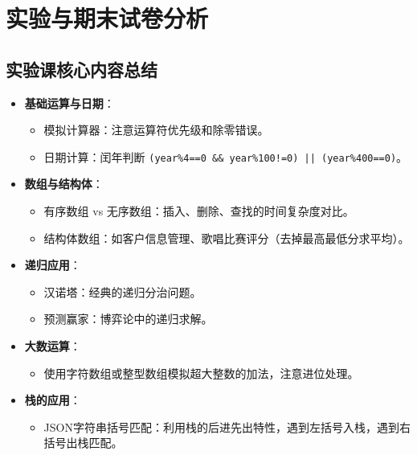 \documentclass[a4paper,12pt]{article}
\begin{document}
\section{实验与期末试卷分析}

\subsection{实验课核心内容总结}
\begin{itemize}
    \item \textbf{基础运算与日期}：
    \begin{itemize}
        \item 模拟计算器：注意运算符优先级和除零错误。
        \item 日期计算：闰年判断 \texttt{(year\%4==0 \&\& year\%100!=0) || (year\%400==0)}。
    \end{itemize}
    \item \textbf{数组与结构体}：
    \begin{itemize}
        \item 有序数组 vs 无序数组：插入、删除、查找的时间复杂度对比。
        \item 结构体数组：如客户信息管理、歌唱比赛评分（去掉最高最低分求平均）。
    \end{itemize}
    \item \textbf{递归应用}：
    \begin{itemize}
        \item 汉诺塔：经典的递归分治问题。
        \item 预测赢家：博弈论中的递归求解。
    \end{itemize}
    \item \textbf{大数运算}：
    \begin{itemize}
        \item 使用字符数组或整型数组模拟超大整数的加法，注意进位处理。
    \end{itemize}
    \item \textbf{栈的应用}：
    \begin{itemize}
        \item JSON字符串括号匹配：利用栈的后进先出特性，遇到左括号入栈，遇到右括号出栈匹配。
    \end{itemize}
\end{itemize}
\end{document}

